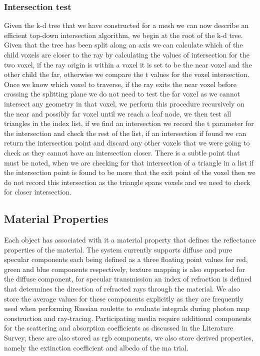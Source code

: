 \subsubsection{Intersection test}
Given the k-d tree that we have constructed for a mesh we can now describe an efficient top-down intersection algorithm,
we begin at the root of the k-d tree. Given that the tree has been split along an axis we can calculate which of the
child voxels are closer to the ray by calculating the values of intersection for the two voxel, if the ray origin is
within a voxel it is set to be the near voxel and the other child the far, otherwise we compare the t values for the
voxel intersection. Once we know which voxel to traverse, if the ray exits the near voxel before crossing the splitting
plane we do not need to test the far voxel as we cannot intersect any geometry in that voxel, we perform this procedure
recursively on the near and possibly far voxel until we reach a leaf node, we then test all triangles in the index list,
if we find an intersection we record the t parameter for the intersection and check the rest of the list, if an intersection
if found we can return the intersection point and discard any other voxels that we were going to check as they cannot
have an intersection closer. There is a subtle point that must be noted, when we are checking for that intersection of
a triangle in a list if the intersection point is found to be more that the exit point of the voxel then we do not
record this intersection as the triangle spans voxels and we need to check for closer intersection.

\subsection{Material Properties}
Each object has associated with it a material property that defines the reflectance properties of the material.
The system currently supports diffuse and pure specular components each being defined as a three floating point
values for red, green and blue components respectively, texture mapping is also supported for the diffuse component,
for specular transmission an index of refraction is defined that determines the direction of refracted rays through the
material. We also store the average values for these components explicitly as they are frequently used when performing
Russian roulette to evaluate integrals during photon map construction and ray-tracing. Participating media require additional
components for the scattering and absorption coefficients as discussed in the Literature Survey, these are also stored
as rgb components, we also store derived properties, namely the extinction coefficient and albedo of the ma trial.
